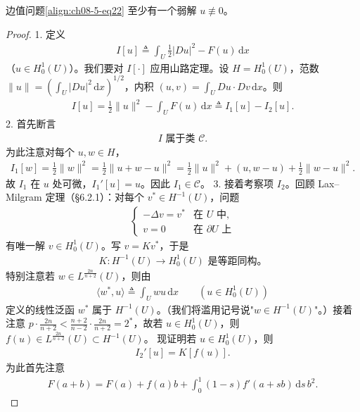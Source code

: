 \documentclass[../../main.tex]{subfiles}
\begin{document}
\begin{theorem}[存在性]\label{theorem:ch08-5-3-半线性存在}
边值问题\eqref{align:ch08-5-eq22} 至少有一个弱解 $u\not\equiv 0$。
\begin{proof}
1. 定义
\begin{align}
I[u]\triangleq\int_U\frac12|Du|^2-F(u)\,\mathrm{d}x\label{align:ch08-5-eq26}
\end{align}
（$u\in H_0^1(U)$）。我们要对 $I[\cdot]$ 应用山路定理。设 $H=H_0^1(U)$，范数 $\|u\|=\left(\int_U|Du|^2\,\mathrm{d}x\right)^{1/2}$，内积 $(u,v)=\int_U Du\cdot Dv\,\mathrm{d}x$。则
\begin{align*}
I[u]=\frac12\|u\|^2-\int_U F(u)\,\mathrm{d}x\triangleq I_1[u]-I_2[u].
\end{align*}
2. 首先断言
\begin{align}
I\text{ 属于类 }\mathcal{C}.\label{align:ch08-5-eq27}
\end{align}
为此注意对每个 $u,w\in H$，
\begin{align*}
I_1[w]=\frac12\|w\|^2=\frac12\|u+w-u\|^2=\frac12\|u\|^2+(u,w-u)+\frac12\|w-u\|^2.
\end{align*}
故 $I_1$ 在 $u$ 处可微，$I_1'[u]=u$。因此 $I_1\in\mathcal{C}$。
3. 接着考察项 $I_2$。回顾 Lax--Milgram 定理（\S6.2.1）：对每个 $v^*\in H^{-1}(U)$，问题
\begin{align*}
\begin{cases}
-\Delta v=v^*&\text{在 }U\text{ 中},\\
v=0&\text{在 }\partial U\text{ 上}
\end{cases}
\end{align*}
有唯一解 $v\in H_0^1(U)$。写 $v=Kv^*$，于是
\begin{align}
K:H^{-1}(U)\to H_0^1(U)\text{ 是等距同构。}\label{align:ch08-5-eq28}
\end{align}
特别注意若 $w\in L^{\frac{2n}{n+2}}(U)$，则由
\begin{align*}
\langle w^*,u\rangle\triangleq\int_U wu\,\mathrm{d}x\qquad (u\in H_0^1(U))
\end{align*}
定义的线性泛函 $w^*$ 属于 $H^{-1}(U)$。（我们将滥用记号说"$w\in H^{-1}(U)$"。）接着注意 $p\cdot\frac{2n}{n+2}<\frac{n+2}{n-2}\cdot\frac{2n}{n+2}=2^*$，故若 $u\in H_0^1(U)$，则 $f(u)\in L^{\frac{2n}{n+2}}(U)\subset H^{-1}(U)$。
现证明若 $u\in H_0^1(U)$，则
\begin{align}
I_2'[u]=K[f(u)].\label{align:ch08-5-eq29}
\end{align}
为此首先注意
\begin{align*}
F(a+b)=F(a)+f(a)b+\int_0^1(1-s)f'(a+sb)\,\mathrm{d}s\,b^2.

\end{align*}
\end{proof}
\end{theorem}
\end{document}
